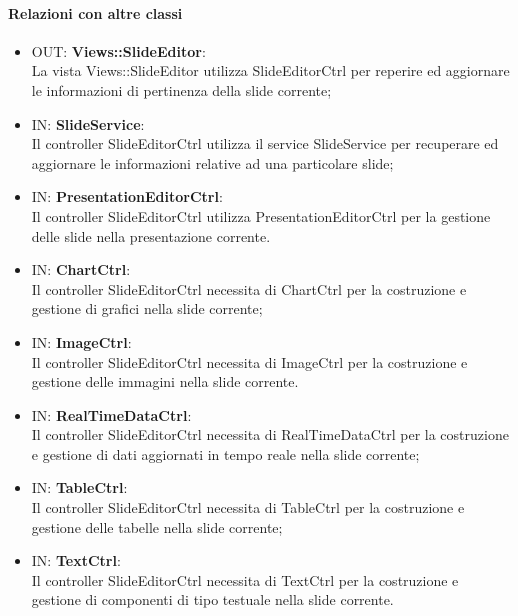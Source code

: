 	\paragraph{Relazioni con altre classi}
	\begin{itemize}
	  \item OUT: \textbf{Views::SlideEditor}:\\
		La vista Views::SlideEditor utilizza SlideEditorCtrl per reperire ed aggiornare le informazioni di pertinenza della slide corrente;
	  \item IN: \textbf{SlideService}:\\
		Il controller SlideEditorCtrl utilizza il service SlideService per recuperare ed aggiornare le informazioni relative ad una particolare slide;
	  \item IN: \textbf{PresentationEditorCtrl}:\\
		Il controller SlideEditorCtrl utilizza  PresentationEditorCtrl per la gestione delle slide nella presentazione corrente.

	\item IN: \textbf{ChartCtrl}:\\
		Il controller SlideEditorCtrl necessita di ChartCtrl per la costruzione e gestione di grafici nella slide corrente;
	\item IN: \textbf{ImageCtrl}:\\
		Il controller SlideEditorCtrl necessita di ImageCtrl per la costruzione e gestione delle immagini nella slide corrente.
	\item IN: \textbf{RealTimeDataCtrl}:\\
		Il controller SlideEditorCtrl necessita di RealTimeDataCtrl per la costruzione e gestione di dati aggiornati in tempo reale nella slide corrente;
	\item IN: \textbf{TableCtrl}:\\
		Il controller SlideEditorCtrl necessita di TableCtrl per la costruzione e gestione delle tabelle nella slide corrente;
	\item IN: \textbf{TextCtrl}:\\
		Il controller SlideEditorCtrl necessita di TextCtrl per la costruzione e gestione di componenti di tipo testuale nella slide corrente.
	\end{itemize}

\newpage


